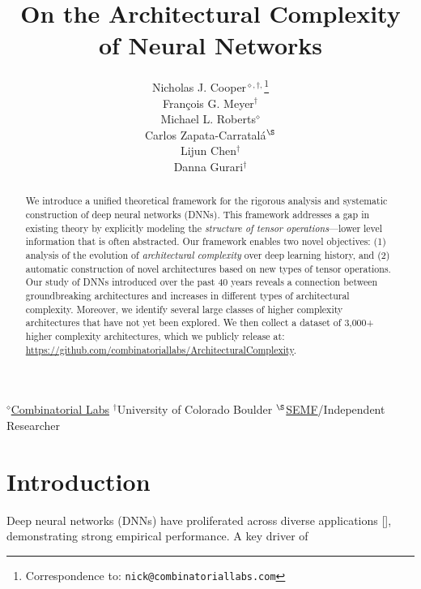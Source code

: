 \documentclass{article}
\title{On the Architectural Complexity of Neural Networks}
\author{%
	Nicholas J. Cooper$^{\diamond,\dag,}$\thanks{Correspondence to: \texttt{nick@combinatoriallabs.com}} \\
	\And
	François G. Meyer$^{\dag}$\\
	\And
	Michael L. Roberts$^{\diamond}$\\
	\And
	Carlos Zapata-Carratalá$^{\S}$\\
	\And
	Lijun Chen$^{\dag}$\\
	\And
	Danna Gurari$^{\dag}$\\
}
\theoremstyle{plain}
\theoremstyle{definition}
\theoremstyle{remark}
\newcommand{\citenump}[1]{[\citenum{#1}]}
\begin{document}
	

\maketitle

\vspace{-2.25em}
\begin{center}
	$^{\diamond}$\href{https://www.combinatoriallabs.com/}{Combinatorial Labs} \hspace{1em} $^{\dag}$University of Colorado Boulder \hspace{1em} $^{\S}$\href{https://semf.org.es/}{SEMF}/Independent Researcher
\end{center}
\vspace{2.25em}

\begin{abstract}
	We introduce a unified theoretical framework for the rigorous analysis and systematic construction of deep neural networks (DNNs). This framework addresses a gap in existing theory by explicitly modeling the \textit{structure of tensor operations}---lower level information that is often abstracted. Our framework enables two novel objectives: (1) analysis of the evolution of \textit{architectural complexity} over deep learning history, and (2) automatic construction of novel architectures based on new types of tensor operations.  Our study of DNNs introduced over the past 40 years reveals a connection between groundbreaking architectures and increases in different types of architectural complexity. Moreover, we identify several large classes of higher complexity architectures that have not yet been explored. We then collect a dataset of 3,000+ higher complexity architectures, which we publicly release at: {\color{blue}\href{https://github.com/combinatoriallabs/ArchitecturalComplexity}{https://github.com/combinatoriallabs/ArchitecturalComplexity}}.
\end{abstract}
\section{Introduction}
Deep neural networks (DNNs) have proliferated across diverse applications \citenump{DLGood1, DLGood2}, demonstrating strong empirical performance. A key driver of
\end{document}
